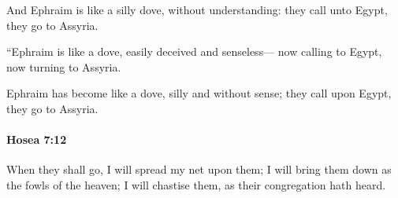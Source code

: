 			\begin{versebox}
					\item[BHS] 
					\item[LXX] 
					\item[ASV] And Ephraim is like a silly dove, without understanding: they call unto Egypt, they go to Assyria.
					\item[NIV] “Ephraim is like a dove, easily deceived and senseless— now calling to Egypt, now turning to Assyria.
					\item[NRSV] Ephraim has become like a dove, silly and without sense; they call upon Egypt, they go to Assyria.
			\end{versebox}

		\paragraph{Hosea 7:12} %
			\label{HOSEA-7-12}

			When they shall go, I will spread my net upon them; I will bring them down as the fowls of the heaven; I will chastise them, as their congregation hath heard.

